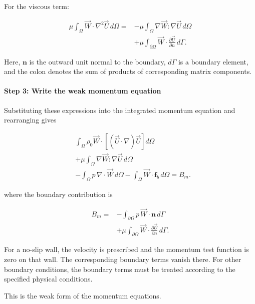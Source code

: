 \documentclass[preprint,3p,number]{elsarticle}
\begin{document}
For the viscous term:

\begin{equation}
\begin{aligned}
\mu\int_\Omega\vec{W}\cdot
\nabla^2\vec{U}\,d\Omega
={}&-\mu\int_\Omega
\nabla\vec{W}:\nabla\vec{U}\,d\Omega\\
&+\mu\int_{\partial\Omega}
\vec{W}\cdot
\frac{\partial\vec{U}}{\partial n}\,d\Gamma.
\end{aligned}
\end{equation}

Here, $\mathbf{n}$ is the outward unit normal to the
boundary, $d\Gamma$ is a boundary element, and the colon
denotes the sum of products of corresponding matrix
components.

\paragraph{Step 3: Write the weak momentum equation}

Substituting these expressions into the integrated
momentum equation and rearranging gives

\begin{equation}
\boxed{
\begin{aligned}
&\int_\Omega \rho_0\vec{W}\cdot
\left[
(\vec{U}\cdot\nabla)\vec{U}
\right]d\Omega\\
&+\mu\int_\Omega
\nabla\vec{W}:\nabla\vec{U}\,d\Omega\\
&-\int_\Omega p\,\nabla\cdot\vec{W}\,d\Omega
-\int_\Omega\vec{W}\cdot
\mathbf{f}_b\,d\Omega=B_m.
\end{aligned}
}
\end{equation}

where the boundary contribution is

\begin{equation}
\begin{aligned}
B_m={}&-\int_{\partial\Omega}p\,
\vec{W}\cdot\mathbf{n}\,d\Gamma\\
&+\mu\int_{\partial\Omega}
\vec{W}\cdot
\frac{\partial\vec{U}}{\partial n}\,d\Gamma.
\end{aligned}
\end{equation}

For a no-slip wall, the velocity is prescribed and the
momentum test function is zero on that wall. The
corresponding boundary terms vanish there. For other
boundary conditions, the boundary terms must be treated
according to the specified physical conditions.

This is the weak form of the momentum equations.
\end{document}

